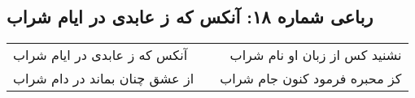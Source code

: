 \begin{center}
\section*{رباعی شماره ۱۸: آنکس که ز عابدی در ایام شراب}
\label{sec:sh018}
\begin{longtable}{l p{0.5cm} r}
آنکس که ز عابدی در ایام شراب
&&
نشنید کس از زبان او نام شراب
\\
از عشق چنان بماند در دام شراب
&&
کز محبره فرمود کنون جام شراب
\\
\end{longtable}
\end{center}
